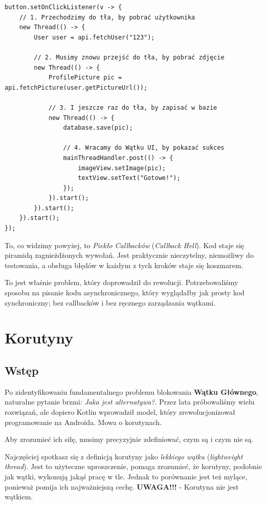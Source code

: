 \begin{verbatim}
button.setOnClickListener(v -> {
    // 1. Przechodzimy do tła, by pobrać użytkownika
    new Thread(() -> {
        User user = api.fetchUser("123");
        
        // 2. Musimy znowu przejść do tła, by pobrać zdjęcie
        new Thread(() -> {
            ProfilePicture pic = api.fetchPicture(user.getPictureUrl());
            
            // 3. I jeszcze raz do tła, by zapisać w bazie
            new Thread(() -> {
                database.save(pic);
                
                // 4. Wracamy do Wątku UI, by pokazać sukces
                mainThreadHandler.post(() -> {
                    imageView.setImage(pic);
                    textView.setText("Gotowe!");
                });
            }).start();
        }).start();
    }).start();
});
\end{verbatim}

To, co widzimy powyżej, to \textit{Piekło Callbacków} (\textit{Callback Hell}). Kod staje się piramidą zagnieżdżonych wywołań. Jest praktycznie nieczytelny, niemożliwy do testowania, a obsługa błędów w każdym z tych kroków staje się koszmarem.

To jest właśnie problem, który doprowadził do rewolucji. Potrzebowaliśmy sposobu na pisanie kodu asynchronicznego, który wyglądałby jak prosty kod synchroniczny; bez callbacków i bez ręcznego zarządzania wątkami.

\section{Korutyny}

\subsection{Wstęp}

Po zidentyfikowaniu fundamentalnego problemu blokowania \textbf{Wątku Głównego}, naturalne pytanie brzmi: \textit{Jaka jest alternatywa?}. Przez lata próbowaliśmy wielu rozwiązań, ale dopiero Kotlin wprowadził model, który zrewolucjonizował programowanie na Androida. Mowa o korutynach.

Aby zrozumieć ich siłę, musimy precyzyjnie zdefiniować, czym są i czym nie są.

Najczęściej spotkasz się z definicją korutyny jako \textit{lekkiego wątku} (\textit{lightweight thread}). Jest to użyteczne uproszczenie, pomaga zrozumieć, że korutyny, podobnie jak wątki, wykonują jakąś pracę w tle. Jednak to porównanie jest też mylące, ponieważ pomija ich najważniejszą cechę. \textbf{UWAGA!!!} - Korutyna nie jest wątkiem.

